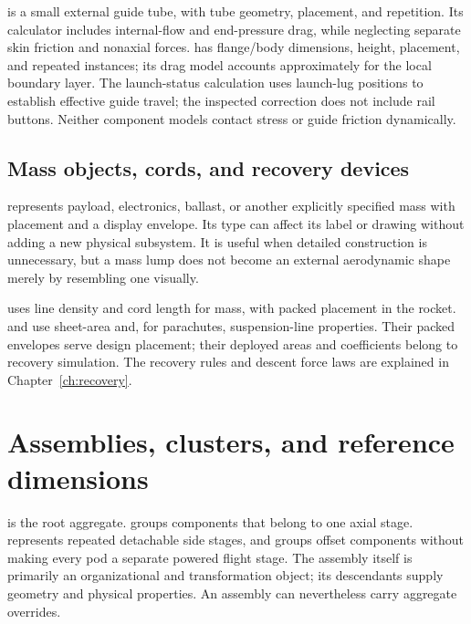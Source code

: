  is a small external guide tube, with tube geometry, placement, and repetition. Its calculator includes internal-flow and end-pressure drag, while neglecting separate skin friction and nonaxial forces.  has flange/body dimensions, height, placement, and repeated instances; its drag model accounts approximately for the local boundary layer. The launch-status calculation uses launch-lug positions to establish effective guide travel; the inspected correction does not include rail buttons. Neither component models contact stress or guide friction dynamically.

\subsection{Mass objects, cords, and recovery devices}
 represents payload, electronics, ballast, or another explicitly specified mass with placement and a display envelope. Its type can affect its label or drawing without adding a new physical subsystem. It is useful when detailed construction is unnecessary, but a mass lump does not become an external aerodynamic shape merely by resembling one visually.

 uses line density and cord length for mass, with packed placement in the rocket.  and  use sheet-area and, for parachutes, suspension-line properties. Their packed envelopes serve design placement; their deployed areas and coefficients belong to recovery simulation. The recovery rules and descent force laws are explained in Chapter~\ref{ch:recovery}.


\section{Assemblies, clusters, and reference dimensions}
 is the root aggregate.  groups components that belong to one axial stage.  represents repeated detachable side stages, and  groups offset components without making every pod a separate powered flight stage. The assembly itself is primarily an organizational and transformation object; its descendants supply geometry and physical properties. An assembly can nevertheless carry aggregate overrides.

